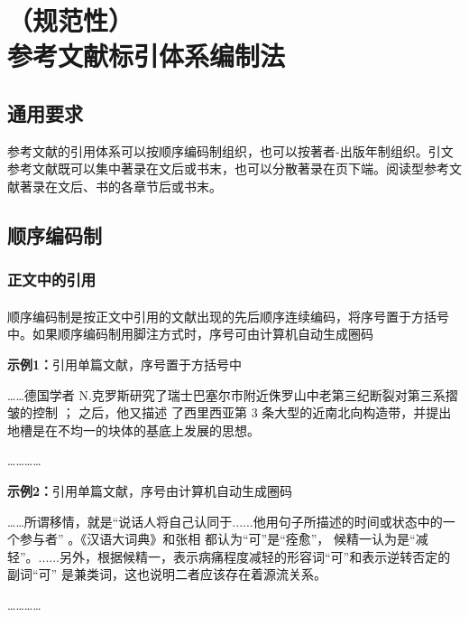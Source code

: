 \documentclass[twoside]{article}%
\begin{document}
\section[参考文献标引体系编制法]{（规范性）\\参考文献标引体系编制法}

\subsection{通用要求}

参考文献的引用体系可以按顺序编码制组织，也可以按著者-出版年制组织。引文参考文献既可以集中著录在文后或书末，也可以分散著录在页下端。阅读型参考文献著录在文后、书的各章节后或书末。

\subsection{顺序编码制}\label{sec:ref:numeric}

\subsubsection{正文中的引用}\label{sec:numeric:cite}

\paragraph{} 顺序编码制是按正文中引用的文献出现的先后顺序连续编码，将序号置于方括号中。如果顺序编码制用脚注方式时，序号可由计算机自动生成圈码

\begin{refsection}
\textbf{示例1：}引用单篇文献，序号置于方括号中

……德国学者 N.克罗斯研究了瑞士巴塞尔市附近侏罗山中老第三纪断裂对第三系摺皱的控制
\cite{Sunstein1996-903-903}； 之后，他又描述
了西里西亚第 3 条大型的近南北向构造带，并提出地槽是在不均一的块体的基底上发展的思想\cite{Morri2010--}。

…………

\textbf{示例2：}引用单篇文献，序号由计算机自动生成圈码

……所谓移情，就是“说话人将自己认同于......他用句子所描述的时间或状态中的一个参与者”
。《汉语大词典》和张相
都认为“可”是“痊愈”，
候精一认为是“减轻”。......另外，根据候精一，表示病痛程度减轻的形容词“可”和表示逆转否定的副词“可”
是兼类词，这也说明二者应该存在着源流关系。

…………
\end{refsection}
\end{document}
